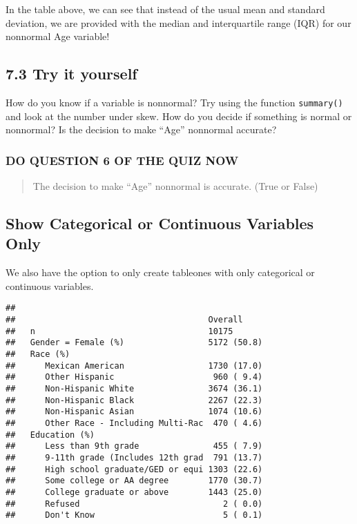 \documentclass[
]{book}
\newenvironment{Shaded}{\begin{snugshade}}{\end{snugshade}}
\newcommand{\DocumentationTok}[1]{\textcolor[rgb]{0.56,0.35,0.01}{\textbf{\textit{#1}}}}
\newcommand{\NormalTok}[1]{#1}
\newcommand{\SpecialCharTok}[1]{\textcolor[rgb]{0.00,0.00,0.00}{#1}}
\begin{document}
In the table above, we can see that instead of the usual mean and standard deviation, we are provided with the median and interquartile range (IQR) for our nonnormal Age variable!

\hypertarget{try-it-yourself-36}{%
\subsection{7.3 Try it yourself}\label{try-it-yourself-36}}

How do you know if a variable is nonnormal? Try using the function \texttt{summary()} and look at the number under skew. How do you decide if something is normal or nonnormal? Is the decision to make ``Age'' nonnormal accurate?

\hypertarget{do-question-6-of-the-quiz-now-3}{%
\subsubsection{DO QUESTION 6 OF THE QUIZ NOW}\label{do-question-6-of-the-quiz-now-3}}

\begin{quote}
The decision to make ``Age'' nonnormal is accurate. (True or False)
\end{quote}

\hypertarget{show-categorical-or-continuous-variables-only}{%
\subsection{Show Categorical or Continuous Variables Only}\label{show-categorical-or-continuous-variables-only}}

We also have the option to only create tableones with only categorical or continuous variables.

\begin{Shaded}
\end{Shaded}

\begin{verbatim}
##
##                                       Overall
##   n                                   10175
##   Gender = Female (%)                 5172 (50.8)
##   Race (%)
##      Mexican American                 1730 (17.0)
##      Other Hispanic                    960 ( 9.4)
##      Non-Hispanic White               3674 (36.1)
##      Non-Hispanic Black               2267 (22.3)
##      Non-Hispanic Asian               1074 (10.6)
##      Other Race - Including Multi-Rac  470 ( 4.6)
##   Education (%)
##      Less than 9th grade               455 ( 7.9)
##      9-11th grade (Includes 12th grad  791 (13.7)
##      High school graduate/GED or equi 1303 (22.6)
##      Some college or AA degree        1770 (30.7)
##      College graduate or above        1443 (25.0)
##      Refused                             2 ( 0.0)
##      Don't Know                          5 ( 0.1)
\end{verbatim}
\end{document}
